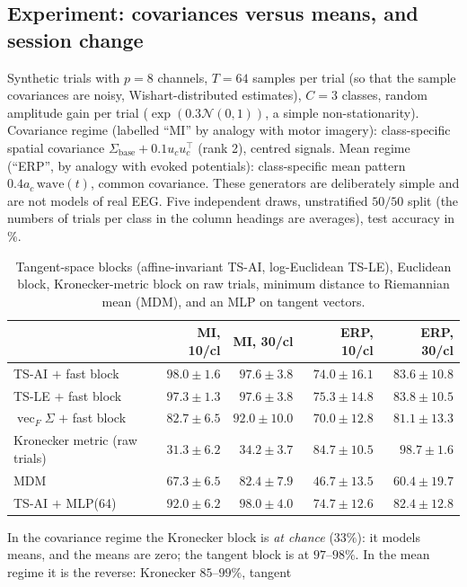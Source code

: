 \documentclass[11pt,a4paper]{article}
\theoremstyle{plain}
\theoremstyle{definition}
\theoremstyle{remark}
\newcommand{\vecop}{\operatorname{vec}}
\newcommand{\T}{\top}
\begin{document}
\subsection{Experiment: covariances versus means, and session change}
\label{sec:riem-exp}
Synthetic trials with $p=8$ channels, $T=64$ samples per trial (so that
the sample covariances are noisy, Wishart-distributed estimates), $C=3$
classes, random amplitude gain per trial ($\exp(0.3\mathcal N(0,1))$, a
simple non-stationarity). Covariance regime (labelled ``MI'' by analogy with
motor imagery): class-specific spatial covariance
$\Sigma_{\mathrm{base}}+0.1u_cu_c^\T$ (rank 2), centred signals. Mean regime
(``ERP'', by analogy with evoked potentials): class-specific mean pattern
$0.4a_c\,\mathrm{wave}(t)$, common covariance. These generators are
deliberately simple and are not models of real EEG. Five independent draws,
unstratified $50/50$ split (the numbers of trials per class in the column
headings are averages), test accuracy in \%.
\begin{table}[h]
\centering\small\renewcommand{\arraystretch}{1.12}
\caption{Tangent-space blocks (affine-invariant TS-AI, log-Euclidean TS-LE), Euclidean block, Kronecker-metric block on raw trials, minimum distance to Riemannian mean (MDM), and an MLP on tangent vectors.}
\label{tab:riem}
\begin{tabular}{@{}lrrrr@{}}
\toprule
& MI, 10/cl & MI, 30/cl & ERP, 10/cl & ERP, 30/cl \\
\midrule
TS-AI $+$ fast block & $\mathbf{98.0}\pm1.6$ & $97.6\pm3.8$ & $74.0\pm16.1$ & $83.6\pm10.8$ \\
TS-LE $+$ fast block & $97.3\pm1.3$ & $97.6\pm3.8$ & $75.3\pm14.8$ & $83.8\pm10.5$ \\
$\vecop_F\Sigma$ $+$ fast block & $82.7\pm6.5$ & $92.0\pm10.0$ & $70.0\pm12.8$ & $81.1\pm13.3$ \\
Kronecker metric (raw trials) & $31.3\pm6.2$ & $34.2\pm3.7$ & $\mathbf{84.7}\pm10.5$ & $\mathbf{98.7}\pm1.6$ \\
MDM & $67.3\pm6.5$ & $82.4\pm7.9$ & $46.7\pm13.5$ & $60.4\pm19.7$ \\
TS-AI $+$ MLP(64) & $92.0\pm6.2$ & $\mathbf{98.0}\pm4.0$ & $74.7\pm12.6$ & $82.4\pm12.8$ \\
\bottomrule
\end{tabular}
\end{table}
In the covariance regime the Kronecker block is \emph{at chance} ($33\%$): it
models means, and the means are zero; the tangent block is at $97$--$98\%$.
In the mean regime it is the reverse: Kronecker $85$--$99\%$, tangent
\end{document}
